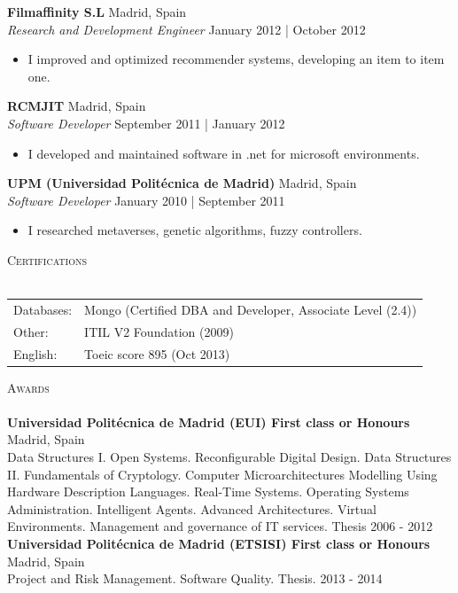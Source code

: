 \documentclass[a4paper]{article}
\newcommand{\lineunder} {
    \vspace*{-8pt} \\
    \hspace*{-18pt} \hrulefill \\
}
\newcommand{\header} [1] {
    {\hspace*{-18pt}\vspace*{6pt} \textsc{#1}}
    \vspace*{-6pt} \lineunder
}
\begin{document}
\textbf{Filmaffinity S.L} \hfill Madrid, Spain\\
\textit{Research and Development Engineer} \hfill January 2012 | October 2012\\
\vspace{-1mm}
\begin{itemize} \itemsep 1pt
	\item I improved and optimized recommender systems, developing an item to item one.
\end{itemize}

\textbf{RCMJIT} \hfill Madrid, Spain\\
\textit{Software Developer} \hfill September 2011 | January 2012\\
\vspace{-1mm}
\begin{itemize} \itemsep 1pt
	\item I developed and maintained software in .net for microsoft environments.
\end{itemize}

\textbf{UPM (Universidad Politécnica de Madrid)} \hfill Madrid, Spain\\
\textit{Software Developer} \hfill January 2010 | September 2011\\
\vspace{-1mm}
\begin{itemize} \itemsep 1pt
	\item I researched metaverses, genetic algorithms, fuzzy controllers.
\end{itemize}

\header{Certifications}
\begin{tabular}{ l l }
	Databases:             & Mongo (Certified DBA and Developer, Associate Level (2.4)) \\
	Other:                 & ITIL V2 Foundation (2009)                                  \\
	English:               & Toeic score 895 (Oct 2013)                                 \\
\end{tabular}

\vspace*{2mm}

\vspace*{2mm}

\header{Awards}
\textbf{Universidad Polit\'ecnica de Madrid (EUI) First class or Honours} \hfill Madrid, Spain\\
Data Structures I. Open Systems. Reconfigurable Digital Design. Data Structures II. Fundamentals of Cryptology. Computer Microarchitectures Modelling Using Hardware Description Languages. Real-Time Systems. Operating Systems Administration. Intelligent Agents. Advanced Architectures. Virtual Environments. Management and governance of IT services. Thesis \hfill 2006 - 2012\\
\vspace*{2mm}
\textbf{Universidad Polit\'ecnica de Madrid (ETSISI) First class or Honours} \hfill Madrid, Spain\\
Project and Risk Management. Software Quality. Thesis. \hfill 2013 - 2014\\
\vspace*{2mm}

\ 
\end{document}
